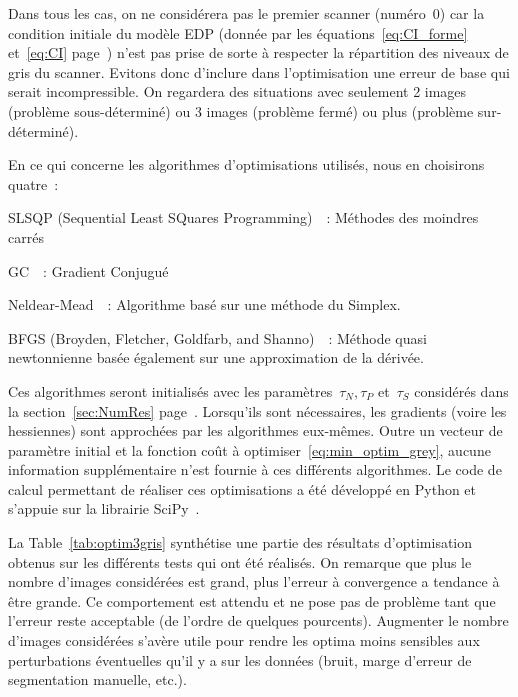 \documentclass[main.tex]{subfiles}
\begin{document}
Dans tous les cas, on ne considérera pas le premier scanner (numéro~0) car la condition initiale du modèle EDP (donnée par les équations~\eqref{eq:CI_forme} et~\eqref{eq:CI} page~\pageref{eq:CI_forme}) n'est pas prise de sorte à respecter la répartition des niveaux de gris du scanner. Evitons donc d'inclure dans l'optimisation une erreur de base qui serait incompressible. On regardera des situations avec seulement 2 images (problème sous-déterminé) ou 3 images (problème fermé) ou plus (problème sur-déterminé).

En ce qui concerne les algorithmes d'optimisations utilisés, nous en choisirons quatre~:
\begin{myitemize}
\item SLSQP (Sequential Least SQuares Programming)~\cite{kraft1988software}~: Méthodes des moindres carrés 
\item GC~\cite{nocedal2006numerical}~: Gradient Conjugué
\item Neldear-Mead~\cite{nelder1965simplex,wright1996direct,wright2010nelder}~: Algorithme basé sur une méthode du Simplex.
\item BFGS (Broyden, Fletcher, Goldfarb, and Shanno)~\cite{nocedal2006numerical}~: Méthode quasi newtonnienne basée  également sur une approximation de la dérivée.
\end{myitemize}
Ces algorithmes seront initialisés avec les paramètres~$\tau_N, \tau_P$ et~$\tau_S$ considérés dans la section~\ref{sec:NumRes} page~\pageref{sec:NumRes}. Lorsqu'ils sont nécessaires, les gradients (voire les hessiennes) sont approchées par les algorithmes eux-mêmes. Outre un vecteur de paramètre initial et la fonction coût à optimiser~\eqref{eq:min_optim_grey}, aucune information supplémentaire n'est fournie à ces différents algorithmes. Le code de calcul permettant de réaliser ces optimisations a été développé en Python et s'appuie sur la librairie SciPy~\cite{jones2014scipy}.  



La Table~\ref{tab:optim3gris} synthétise une partie des résultats d'optimisation obtenus sur les différents tests qui ont été réalisés. 
On remarque que plus le nombre d'images considérées est grand, plus l'erreur à convergence a tendance à être grande. Ce comportement est attendu et ne pose pas de problème tant que l'erreur reste acceptable (de l'ordre de quelques pourcents). Augmenter le nombre d'images considérées s'avère utile pour rendre les optima moins sensibles aux perturbations éventuelles qu'il y a sur les données (bruit, marge d'erreur de segmentation manuelle, etc.).
\end{document}
